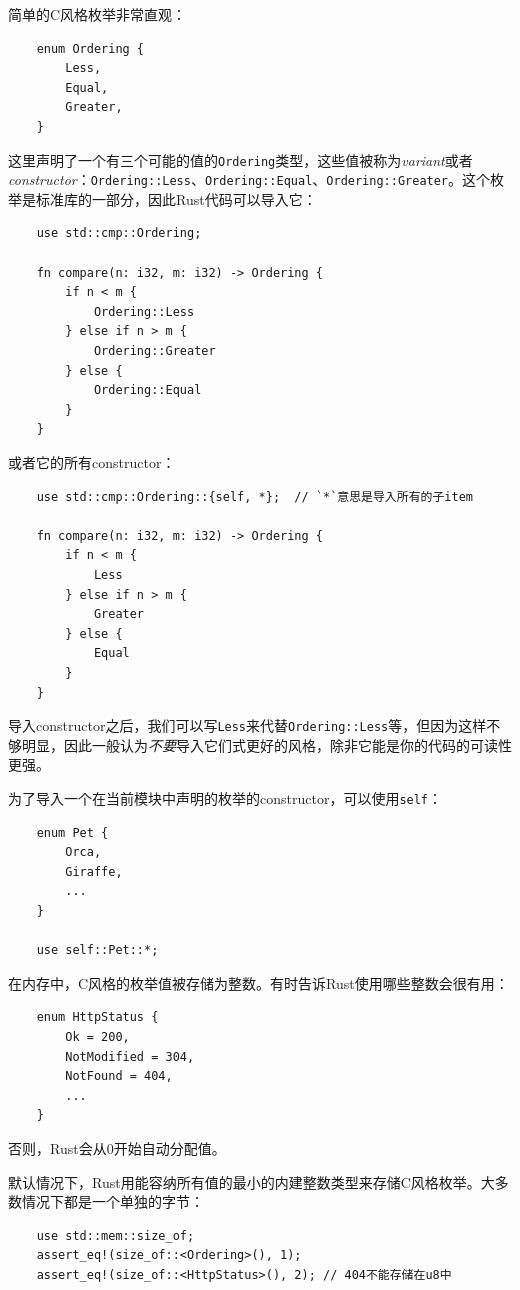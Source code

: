 简单的C风格枚举非常直观：
\begin{verbatim}
    enum Ordering {
        Less,
        Equal,
        Greater,
    }
\end{verbatim}

这里声明了一个有三个可能的值的\texttt{Ordering}类型，这些值被称为\emph{variant}或者\emph{constructor}：\texttt{Ordering::Less}、\texttt{Ordering::Equal}、\texttt{Ordering::Greater}。这个枚举是标准库的一部分，因此Rust代码可以导入它：
\begin{verbatim}
    use std::cmp::Ordering;

    fn compare(n: i32, m: i32) -> Ordering {
        if n < m {
            Ordering::Less
        } else if n > m {
            Ordering::Greater
        } else {
            Ordering::Equal
        }
    }
\end{verbatim}

或者它的所有constructor：
\begin{verbatim}
    use std::cmp::Ordering::{self, *};  // `*`意思是导入所有的子item

    fn compare(n: i32, m: i32) -> Ordering {
        if n < m {
            Less
        } else if n > m {
            Greater
        } else {
            Equal
        }
    }
\end{verbatim}

导入constructor之后，我们可以写\texttt{Less}来代替\texttt{Ordering::Less}等，但因为这样不够明显，因此一般认为\emph{不要}导入它们式更好的风格，除非它能是你的代码的可读性更强。

为了导入一个在当前模块中声明的枚举的constructor，可以使用\texttt{self}：
\begin{verbatim}
    enum Pet {
        Orca,
        Giraffe,
        ...
    }

    use self::Pet::*;
\end{verbatim}

在内存中，C风格的枚举值被存储为整数。有时告诉Rust使用哪些整数会很有用：
\begin{verbatim}
    enum HttpStatus {
        Ok = 200,
        NotModified = 304,
        NotFound = 404,
        ...
    }
\end{verbatim}

否则，Rust会从0开始自动分配值。

默认情况下，Rust用能容纳所有值的最小的内建整数类型来存储C风格枚举。大多数情况下都是一个单独的字节：
\begin{verbatim}
    use std::mem::size_of;
    assert_eq!(size_of::<Ordering>(), 1);
    assert_eq!(size_of::<HttpStatus>(), 2); // 404不能存储在u8中
\end{verbatim}

